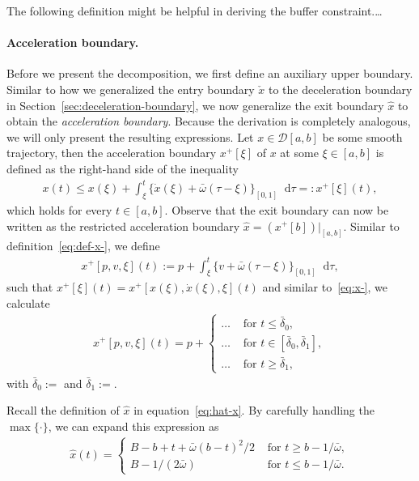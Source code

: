 \documentclass[a4paper]{report}
\theoremstyle{definition}
\theoremstyle{plain}
\newcommand*\diff{\mathop{}\!\mathrm{d}}
\newcommand\note[1]{{\color{Navy}#1}}
\begin{document}
\note{The following definition might be helpful in deriving the buffer constraint.\dots}

\paragraph{Acceleration boundary.}
Before we present the decomposition, we first define an auxiliary upper
boundary.
%
Similar to how we generalized the entry boundary $\check{x}$ to the deceleration
boundary in Section~\ref{sec:deceleration-boundary}, we now generalize the exit
boundary $\hat{x}$ to obtain the \emph{acceleration boundary}.
%
Because the derivation is completely analogous, we will only present the
resulting expressions.
%
Let $x \in \mathcal{D}[a,b]$ be some smooth trajectory, then the acceleration
boundary $x^{+}[\xi]$ of $x$ at some $\xi \in [a,b]$ is defined as the
right-hand side of the inequality
\begin{align}
  x(t) \leq x(\xi) + \int_{\xi}^{t} \{\dot{x}(\xi) + \bar{\omega} (\tau - \xi) \}_{[0,1]} \diff \tau =: x^{+}[\xi](t) ,
\end{align}
which holds for every $t \in [a,b]$.
%
Observe that the exit boundary can now be written as the restricted acceleration
boundary $\hat{x} = (x^{+}[b])|_{[a,b]}$.
%
Similar to definition~\eqref{eq:def-x-}, we define
\begin{align}
  x^{+}[p,v,\xi](t) := p + \int_{\xi}^{t}\{ v + \bar{\omega}(\tau - \xi)\}_{[0,1]} \diff \tau ,
\end{align}
such that $x^{+}[\xi](t) = x^{+}[x(\xi),\dot{x}(\xi),\xi](t)$ and
%
similar to~\eqref{eq:x-}, we calculate
\begin{align}
  x^{+}[p,v,\xi](t) = p +
  \begin{cases}
    \dots &\text{ for } t \leq \bar{\delta}_{0} , \\
    \dots &\text{ for } t \in [\bar{\delta}_{0}, \bar{\delta}_{1} ] , \\
    \dots &\text{ for } t \geq \bar{\delta}_{1} ,
  \end{cases}
\end{align}
with $\bar{\delta}_{0} := $ and $\bar{\delta}_{1} := $.

\note{
Recall the definition of $\hat{x}$ in equation~\eqref{eq:hat-x}. By carefully
handling the $\max\{\cdot\}$, we can expand this expression as
\begin{align}
  \hat{x}(t) =
  \begin{cases}
    B - b + t + \bar{\omega} (b-t)^{2} / 2 &\text{ for } t \geq b - 1/\bar{\omega} , \\
    B - 1/(2\bar{\omega}) &\text{ for } t \leq b - 1/\bar{\omega} .
  \end{cases}
\end{align}
}
\end{document}
